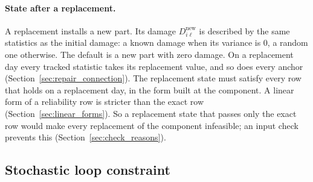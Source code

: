 \documentclass[11pt,a4paper]{article}
\theoremstyle{plain}
\theoremstyle{definition}
\theoremstyle{remark}
\begin{document}
\paragraph{State after a replacement.}
A replacement installs a new part.
Its damage $D^{\mathrm{new}}_{i\ell}$ is described by the same statistics as the initial damage: a known damage when its variance is $0$, a random one otherwise.
The default is a new part with zero damage.
On a replacement day every tracked statistic takes its replacement value, and so does every anchor (Section~\ref{sec:repair_connection}).
The replacement state must satisfy every row that holds on a replacement day, in the form built at the component.
A linear form of a reliability row is stricter than the exact row (Section~\ref{sec:linear_forms}).
So a replacement state that passes only the exact row would make every replacement of the component infeasible; an input check prevents this (Section~\ref{sec:check_reasons}).

\subsection{Stochastic loop constraint}
\label{sec:loop_constraint}
\end{document}
